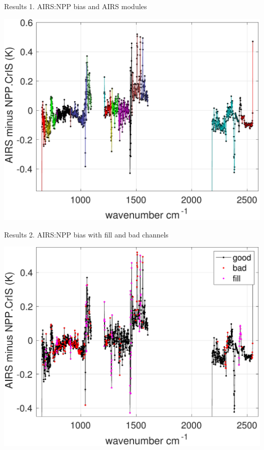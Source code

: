 \documentclass[10pt,t]{beamer}
\begin{document}
\begin{frame}{Results 1. AIRS:NPP bias and AIRS modules}

\vspace{-0.1in}
\begin{block}{}
  \begin{center}
    \includegraphics[width=0.6\linewidth]{./Figs/2018_ac1_sno_mean_bias_vs_modules.pdf}
  \end{center}
\end{block}
    
\end{frame}

\begin{frame}{Results 2. AIRS:NPP bias with fill and bad channels}

\vspace{-0.1in}
\begin{block}{}
  \begin{center}
    \includegraphics[width=0.6\linewidth]{./Figs/2018_airs_npp_ac1_stats_bias_wbad_fill.pdf}
  \end{center}
\end{block}
    
\end{frame}
\end{document}
